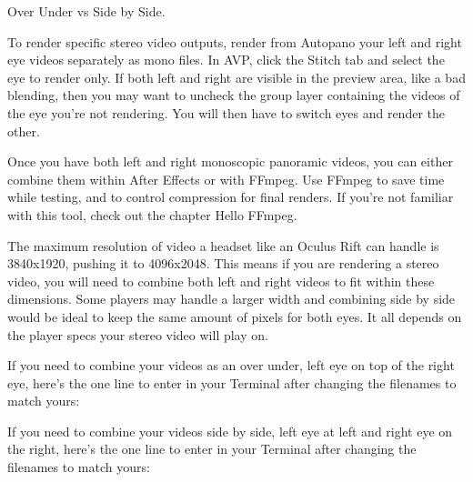 \begin{fullwidth}
\clearpage
{\large Over Under vs Side by Side. \par}

To render specific stereo video outputs, render from Autopano your left and right eye videos separately as mono files. In AVP, click the Stitch tab and select the eye to render only. If both left and right are visible in the preview area, like a bad blending, then you may want to uncheck the group layer containing the videos of the eye you’re not rendering. You will then have to switch eyes and render the other.

Once you have both left and right monoscopic panoramic videos, you can either combine them within After Effects or with FFmpeg. Use FFmpeg to save time while testing, and to control compression for final renders. If you’re not familiar with this tool, check out the chapter Hello FFmpeg. 

The maximum resolution of video a headset like an Oculus Rift can handle is 3840x1920, pushing it to 4096x2048. This means if you are rendering a stereo video, you will need to combine both left and right videos to fit within these dimensions. Some players may handle a larger width and combining side by side would be ideal to keep the same amount of pixels for both eyes. It all depends on the player specs your stereo video will play on. 

If you need to combine your videos as an over under, left eye on top of the right eye, here’s the one line to enter in your Terminal after changing the filenames to match yours:


If you need to combine your videos side by side, left eye at left and right eye on the right, here’s the one line to enter in your Terminal after changing the filenames to match yours:




\clearpage
\end{fullwidth}
